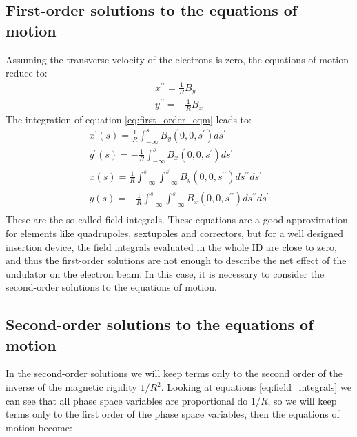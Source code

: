 \documentclass[a4paper,12pt]{article}
\begin{document}
\subsection{First-order solutions to the equations of motion}
\par Assuming the transverse velocity of the electrons is zero, the equations of motion reduce to:
\begin{equation}
    \begin{aligned}
        x^{\prime\prime} = \frac{1}{R}B_y\\
        y^{\prime\prime} = -\frac{1}{R}B_x
    \end{aligned}
    \label{eq:first_order_eqm}
\end{equation}
The integration of equation \eqref{eq:first_order_eqm} leads to:
\begin{equation}
    \begin{aligned}
        x^{\prime}(s) = \frac{1}{R}\int_{-\infty}^{s} B_y(0, 0, s^{\prime}) ds^{\prime}\\
        y^{\prime}(s) = -\frac{1}{R}\int_{-\infty}^{s}B_x(0, 0, s^{\prime}) ds^{\prime}\\
        x(s) = \frac{1}{R}\int_{-\infty}^{s}\int_{-\infty}^{s^{\prime}}B_y(0, 0, s^{\prime\prime}) ds^{\prime\prime} ds^{\prime}\\
        y(s) = -\frac{1}{R}\int_{-\infty}^{s}\int_{-\infty}^{s^{\prime}}B_x(0, 0, s^{\prime\prime}) ds^{\prime\prime} ds^{\prime}\\
    \end{aligned}
    \label{eq:field_integrals}
\end{equation} 
These are the so called field integrals. These equations are a good approximation for elements like quadrupoles, sextupoles and correctors,
 but for a well designed insertion device, the field integrals evaluated in the whole ID are close to zero, and thus the first-order solutions are not enough to describe
  the net effect of the undulator on the electron beam. In this case, it is necessary to consider the second-order solutions to the equations of motion.

\subsection{Second-order solutions to the equations of motion}

In the second-order solutions we will keep terms only to the second order of the inverse of the magnetic rigidity $1/R^2$. Looking at equations 
\eqref{eq:field_integrals} we can see that all phase space variables are proportional do $1/R$, so we will keep terms only to the first order of the
phase space variables, then the equations of motion become:
\end{document}

